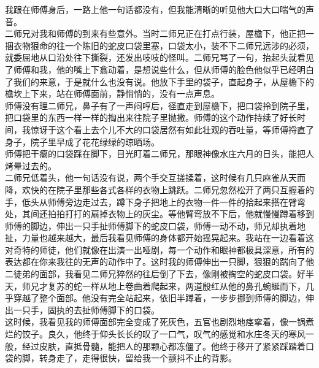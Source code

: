 我跟在师傅身后，一路上他一句话都没有，但我能清晰的听见他大口大口喘气的声音。\\

二师兄对我和师傅的到来有些意外。当时二师兄正在打点行装，屋檐下，他正把一捆衣物狠命的往一个陈旧的蛇皮口袋里塞，口袋太小，装不下二师兄远涉的必须，就委屈地从口沿处往下撕裂，还发出吱吱的怪叫。二师兄骂了一句，抬起头就看见了师傅和我，他的嘴上下翕动着，是想说些什么，但从师傅的脸色他似乎已经明白了我们的来意，于是就什么也没有说。他放下手里的袋子，直起身子，从屋檐下的檐坎上下来，站在师傅面前，静悄悄的，没有一点声息。\\

师傅没有理二师兄，鼻子有了一声闷哼后，径直走到屋檐下，把口袋拎到院子里，把口袋里的东西一样一样的掏出来往院子里抛撒。师傅的这个动作持续了好长时间，我惊讶于这个看上去个儿不大的口袋居然有如此壮观的吞吐量，等师傅捋直了身子，院子里早成了花花绿绿的晾晒场。\\

师傅把干瘪的口袋踩在脚下，目光盯着二师兄，那眼神像水庄六月的日头，能把人烤晕过去的。\\

二师兄低着头，他一句话没有说，两个手交互搓揉着，这时候有几只麻雀从天而降，欢快的在院子里那些各式各样的衣物上跳跃。二师兄忽然松开了两只互握着的手，低头从师傅旁边走过去，蹲下身子把地上的衣物一件一件的拾起来搭在臂弯处，其间还拍拍打打的扇掉衣物上的灰尘。等他臂弯放不下后，他就慢慢蹲着移到师傅的脚边，伸出一只手扯师傅脚下的蛇皮口袋，师傅一动不动，师兄却执着地扯，力量也越来越大，最后我看见师傅的身体都开始摇晃起来。我站在一边看着这对奇特的师徒，他们就像在出演一出哑剧，每一个动作和眼神都极具深意，所有的表达都在你来我往的无声的动作中了。这时我的师傅伸出一只脚，狠狠的踹向了他二徒弟的面部，我看见二师兄猝然的往后倒了下去，像刚被掏空的蛇皮口袋。好半天，师兄才复苏的蛇一样从地上卷曲着爬起来，两道殷红从他的鼻孔蜿蜒而下，几乎穿越了整个面部。他没有完全站起来，依旧半蹲着，一步步挪到师傅的脚边，伸出一只手，固执的去扯师傅脚下的口袋。\\

这时候，我看见我的师傅面部完全变成了死灰色，五官也剧烈地痉挛着，像一锅煮烂的饺子。良久，他终于仰头长长的叹了一口气，叹气的感觉和水庄冬天的寒风一般，经过皮肤，直抵骨髓，能把人的那颗心都冻僵了。他终于移开了紧紧踩踏着口袋的脚，转身走了，走得很快，留给我一个颤抖不止的背影。\\
